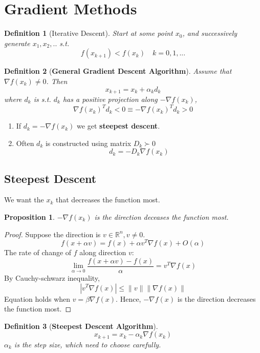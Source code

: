 \documentclass[11pt,a4paper]{article}
\newtheorem{proposition}{Proposition}
\newtheorem{definition}{Definition}
\begin{document}
\section{Gradient Methods}
\begin{definition}[Iterative Descent]
Start at some point $x_0$, and successively generate $x_1,x_2,..$ s.t. $$f(x_{k+1})<f(x_k)\quad k=0,1,...$$
\end{definition}

\begin{definition}[\textbf{General Gradient Descent Algorithm}]
    Assume that $\nabla f(x_k)\neq 0$. Then
    $$x_{k+1}=x_k+\alpha_k d_k$$
    where $d_k$ is s.t. $d_k$ has a positive projection along $-\nabla f(x_k)$,
    $$\nabla f(x_k)^T d_k<0 \equiv -\nabla f(x_k)^T d_k>0$$
\end{definition}
\begin{enumerate}[$\bullet$]
    \item If $d_k=-\nabla f(x_k)$ we get \textbf{steepest descent}.
    \item Often $d_k$ is constructed using matrix $D_k \succ 0$ $$d_k=-D_k\nabla f(x_k)$$
\end{enumerate}

\subsection{Steepest Descent}
We want the $x_k$ that decreases the function most.
\begin{proposition}
$-\nabla f(x_k)$ is the direction deceases the function most.
\end{proposition}
\begin{proof}
Suppose the direction is $v\in \mathbb{R}^n, v\neq 0$.
$$f(x+\alpha v)=f(x)+\alpha v^T \nabla f(x)+O(\alpha)$$
The rate of change of $f$ along direction $v$:
$$\lim_{\alpha \rightarrow 0}\frac{f(x+\alpha v)-f(x)}{\alpha}=v^T\nabla f(x)$$
By Cauchy-schwarz inequality,
$$|v^T\nabla f(x)|\leq \|v\|\|\nabla f(x)\|$$
Equation holds when $v=\beta \nabla f(x)$. Hence, $-\nabla f(x)$ is the direction decreases the function most.
\end{proof}

\begin{definition}[\textbf{Steepest Descent Algorithm}]
$$x_{k+1}=x_k-\alpha_k \nabla f(x_k)$$
$\alpha_k$ is the step size, which need to choose carefully.
\end{definition}
\end{document}
